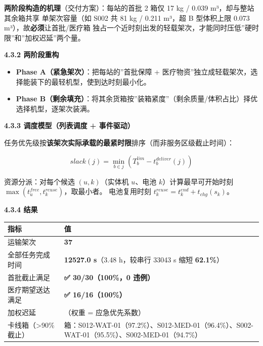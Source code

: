 \documentclass[
  10.5pt,
]{article}
\newcounter{none} %
\providecommand{\tightlist}{%
  \setlength{\itemsep}{0pt}\setlength{\parskip}{0pt}}
\begin{document}
\textbf{两阶段构造的机理}（交付方案）：每站的首批 2 箱仅 17 kg / 0.039
m³，却与整站其余箱共享 单架次容量（如 S002 共 81 kg / 0.211 m³，超 B
型体积上限 0.073 m³），故\textbf{必须}让首批/医疗箱
独占一个近时刻出发的轻载架次，才能同时压低''硬时限''和''加权迟延''两个量。

\textbf{4.3.2 两阶段重构}

\begin{itemize}
\tightlist
\item
  \textbf{Phase A（紧急架次）}：把每站的''首批保障 +
  医疗物资''独立成轻载架次，选择能装下的最轻机型，使到达时刻最小化。
\item
  \textbf{Phase
  B（剩余填充）}：将其余货箱按''装箱紧度''（剩余质量/体积占比）择优选择机型，逐架次装满。
\end{itemize}

\textbf{4.3.3 调度模型（列表调度 + 事件驱动）}

任务优先级按\textbf{该架次实际承载的最紧时限}排序（而非服务区级截止时间）：

\[slack(j)=\min_{b\in j}\left(T^{lim}_b-t^{deliver}_b(j)\right)\]

资源分派：对每个候选 \((u,k)\)（实体机 \(u\)、电池
\(k\)）计算最早可开始时刻 \(\max(t^{free}_u,t^{reuse}_k)\)，取最小者。
电池复用时刻 \(t^{reuse}_k=t^{end}_k+t_{chg}(s_k)\)。

\textbf{4.3.4 结果}

{\def\LTcaptype{none} %
\begin{longtable}[]{@{}
  >{\raggedright\arraybackslash}p{}
  >{\raggedright\arraybackslash}p{}@{}}
\toprule\noalign{}
\begin{minipage}[b]{\linewidth}\raggedright
指标
\end{minipage} & \begin{minipage}[b]{\linewidth}\raggedright
值
\end{minipage} \\
\midrule\noalign{}
\endhead
\bottomrule\noalign{}
\endlastfoot
运输架次 & \textbf{37} \\
全部任务完成时间 & \textbf{12527.0 s}（3.48 h，较串行 33043 s 缩短
\textbf{62.1\%}） \\
首批截止满足 & \textbf{✅ 30/30（100\%，0 违例）} \\
医疗期望送达满足 & \textbf{✅ 16/16（100\%）} \\
加权迟延 & 221985.2（权重 = 应急优先系数） \\
卡线箱（\textgreater90\% 截止） & 4
箱：S012-WAT-01（97.2\%）、S012-MED-01（96.4\%）、S002-WAT-01（95.5\%）、S002-MED-01（94.7\%） \\
\end{longtable}
}
\end{document}
